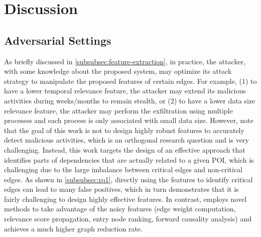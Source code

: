 \section{Discussion}
\label{sec:discussion}


\subsection{Adversarial Settings}
As briefly discussed in \cref{subsubsec:feature-extraction}, in practice, the attacker, with some knowledge about the proposed system, may optimize its attack strategy to manipulate the proposed features of certain edges. 
For example, (1) to have a lower temporal relevance feature, the attacker may extend its malicious activities during weeks/months to remain stealth, or (2) to have a lower data size relevance feature, the attacker may perform the exfiltration using multiple processes and each process is only associated with small data size. 
%
However, note that the goal of this work is not to design highly robust features to accurately detect malicious activities, which is an orthogonal research question and is very challenging.
Instead, this work targets the design of an effective approach that identifies parts of dependencies that are actually related to a given POI, which is challenging due to the large imbalance between critical edges and non-critical edges.
%
As shown in \cref{subsubsec:rq1}, directly using the features to identify critical edges can lead to many false positives, which in turn demonstrates that it is fairly challenging to design highly effective features.
In contrast, \tool employs novel methods to take advantage of the noisy features (\ie edge weight computation, relevance score propagation, entry node ranking, forward causality analysis) and achieves a much higher graph reduction rate.
%


